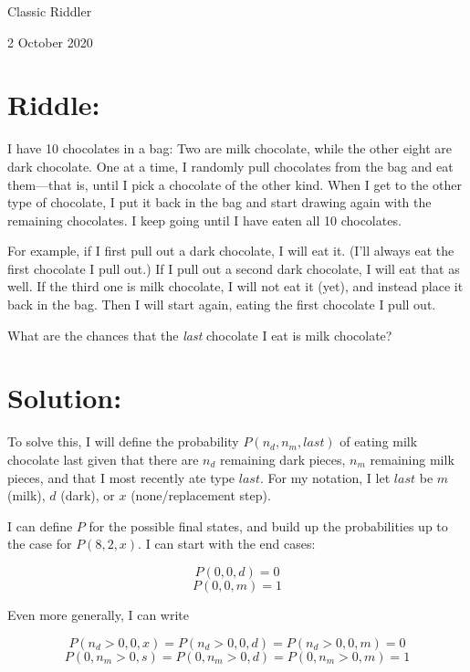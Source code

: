 \documentclass{article}
\begin{document}
\pagestyle{empty} %

\begin{center}
{\LARGE Classic Riddler}

\vspace{0.15in}

{\Large 2 October 2020}
\end{center}


\section*{Riddle:}

I have 10 chocolates in a bag: Two are milk chocolate, while the other eight are dark chocolate.
One at a time, I randomly pull chocolates from the bag and eat them---that is, until I pick a chocolate of the other kind.
When I get to the other type of chocolate, I put it back in the bag and start drawing again with the remaining chocolates.
I keep going until I have eaten all 10 chocolates.

For example, if I first pull out a dark chocolate, I will eat it.
(I'll always eat the first chocolate I pull out.)
If I pull out a second dark chocolate, I will eat that as well.
If the third one is milk chocolate, I will not eat it (yet), and instead place it back in the bag.
Then I will start again, eating the first chocolate I pull out.

What are the chances that the \textit{last} chocolate I eat is milk chocolate?

\section*{Solution:}

To solve this, I will define the probability $P(n_{d},n_{m},last)$ of eating milk chocolate last given that there are $n_{d}$ remaining dark pieces, $n_{m}$ remaining milk pieces, and that I most recently ate type $last$.
For my notation, I let $last$ be $m$ (milk), $d$ (dark), or $x$ (none/replacement step).

I can define $P$ for the possible final states, and build up the probabilities up to the case for $P(8,2,x)$.
I can start with the end cases:

\[
P(0,0,d)=0
\]
\[
P(0,0,m)=1
\]

Even more generally, I can write

\[
P(n_{d}>0,0,x)=P(n_{d}>0,0,d)=P(n_{d}>0,0,m)=0
\]
\[
P(0,n_{m}>0,s)=P(0,n_{m}>0,d)=P(0,n_{m}>0,m)=1
\]
\end{document}
